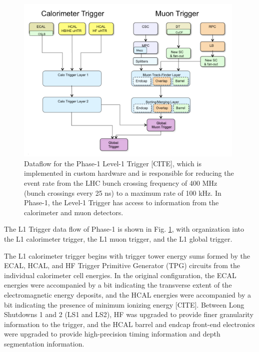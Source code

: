 \documentclass{article}
\begin{document}
\begin{figure}[ht]
    \centering
    \includegraphics[width=11cm]{figures/phase-1-level-1-trigger-dataflow.png}
    \caption{Dataflow for the Phase-1 Level-1 Trigger [CITE], which is implemented in custom hardware and is responsible for reducing the event rate from the LHC bunch crossing frequency of 400 MHz (bunch crossings every 25 ns) to a maximum rate of 100 kHz. In Phase-1, the Level-1 Trigger has access to information from the calorimeter and muon detectors.}
    \label{fig:phase-1-level-1-trigger-dataflow}
\end{figure}


The L1 Trigger data flow of Phase-1 is shown in Fig. \ref{fig:phase-1-level-1-trigger-dataflow}, with organization into the L1 calorimeter trigger, the L1 muon trigger, and the L1 global trigger. 

The L1 calorimeter trigger begins with trigger tower energy sums formed by the ECAL, HCAL, and HF Trigger Primitive Generator (TPG) circuits from the individual calorimeter cell energies. In the original configuration, the ECAL energies were accompanied by a bit indicating the transverse extent of the electromagnetic energy deposits, and the HCAL energies were accompanied by a bit indicating the presence of minimum ionizing energy [CITE]. Between Long Shutdowns 1 and 2 (LS1 and LS2), HF was upgraded to provide finer granularity information to the trigger, and the HCAL barrel and endcap front-end electronics were upgraded to provide high-precision timing information and depth segmentation information. 
\end{document}
